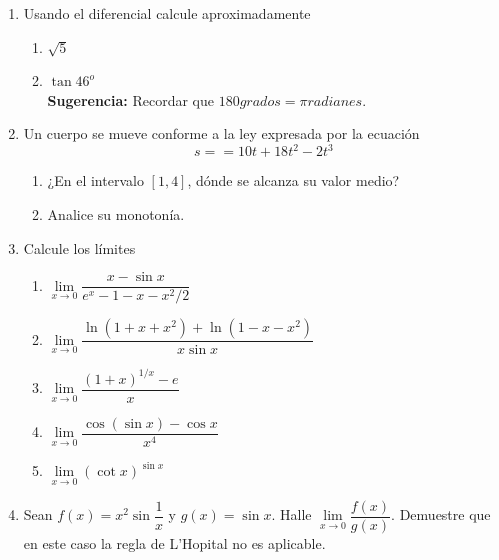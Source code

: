 \documentclass[10pt,twoside]{SelfArx} %
\begin{document}
    \begin{enumerate}%
    	\item Usando el diferencial calcule aproximadamente
    	\begin{enumerate}
    		\item $ \sqrt{5} $
    		\item $ \tan 46^{o} $\\
\textbf{ Sugerencia:}    		Recordar que    		$ 180grados=\pi radianes $.
    	\end{enumerate}
    	\item Un cuerpo se mueve conforme a la ley expresada por la ecuación 
    	\begin{equation}
    	s==10t+18t^{2}-2t^{3}
    	\end{equation}
    	\begin{enumerate}
    		\item ¿En el intervalo $ [1,4] $, dónde se alcanza su valor medio?
    		\item Analice su monotonía.
    	\end{enumerate}
    	
    	\item Calcule los límites
    	  \begin{enumerate}
    	  	\item $ \lim\limits_{x\rightarrow0}\dfrac{x-\sin x}{e^{x}-1-x-x^{2}/2} $
    	  	\item $ \lim\limits_{x\rightarrow0}\dfrac{\ln(1+x+x^{2})+\ln(1-x-x^{2})}{x\sin x} $
    	  	\item $ \lim\limits_{x\rightarrow0}\dfrac{(1+x)^{1/x}-e}{x} $
    	  	\item $ \lim\limits_{x\rightarrow0}\dfrac{\cos(\sin x)-\cos x}{x^{4}} $
    	  	\item $ \lim\limits_{x\rightarrow0}(\cot x)^{\sin x} $
    	  \end{enumerate}
       	\item Sean $ f(x)=x^{2}\sin \dfrac{1}{x} $ y $ g(x)=\sin x $. Halle $ \lim\limits_{x\rightarrow0}\dfrac{f(x)}{g(x)} $. Demuestre que en este caso la regla de L'Hopital no es aplicable.	
    	
    	
    	
    	
    \end{enumerate}%
    
    
    
    
    
    
    
    
    
\end{document}
